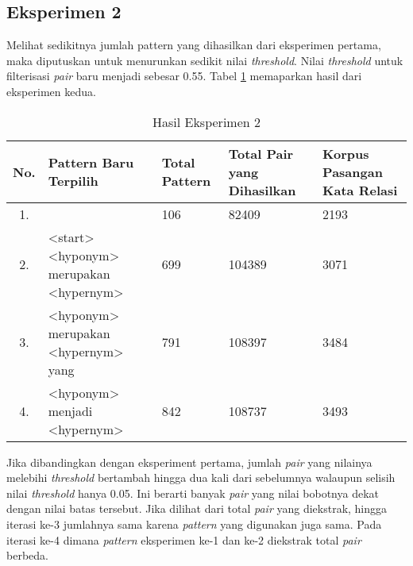 \subsection{Eksperimen 2}
Melihat sedikitnya jumlah pattern yang dihasilkan dari eksperimen pertama, maka diputuskan untuk menurunkan sedikit nilai \textit{threshold}. Nilai \textit{threshold} untuk filterisasi \textit{pair} baru menjadi sebesar 0.55. Tabel \ref{table:eksp2} memaparkan hasil dari eksperimen kedua.
\begin{table}
  \centering
  \caption{Hasil Eksperimen 2}
  \label{table:eksp2}
  \begin{tabular}{|c|m{14em}|m{4em}|m{4em}|m{4em}|}
    \hline
      No. & Pattern Baru Terpilih & Total Pattern & Total Pair yang Dihasilkan & Korpus Pasangan Kata Relasi \\ \hline
      1.  &                                            & 106  &  82409   &  2193  \\ \hline
      2.  & <start> <hyponym> merupakan <hypernym>     & 699  &  104389  &  3071 \\ \hline
      3.  & <hyponym> merupakan <hypernym> yang        & 791  &  108397  &  3484 \\ \hline
      4.  & <hyponym> menjadi <hypernym>               & 842  &  108737  &  3493 \\ \hline
  \end{tabular}
\end{table}

\noindent Jika dibandingkan dengan eksperiment pertama, jumlah \textit{pair} yang nilainya melebihi \textit{threshold} bertambah hingga dua kali dari sebelumnya walaupun selisih nilai \textit{threshold} hanya 0.05. Ini berarti banyak \textit{pair} yang nilai bobotnya dekat dengan nilai batas tersebut. Jika dilihat dari total \textit{pair} yang diekstrak, hingga iterasi ke-3 jumlahnya sama karena \textit{pattern} yang digunakan juga sama. Pada iterasi ke-4 dimana \textit{pattern} eksperimen ke-1 dan ke-2 diekstrak total \textit{pair} berbeda.

